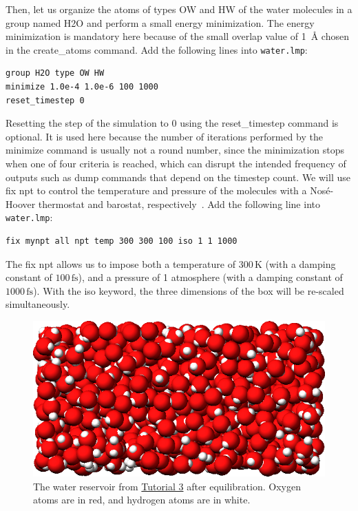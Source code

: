 \documentclass[9pt,tutorial]{livecoms}
\newcommand{\lmpcmd}[1]{\hspace{0pt}\colorbox{listing}{\textcolor{command}{\small{#1}}}\hspace{0pt}} %
\newcommand{\flecmd}[1]{\textcolor{command}{\texttt{#1}}} %
\begin{document}
Then, let us organize the atoms of types OW and HW of the water
molecules in a group named \lmpcmd{H2O} and perform a small energy
minimization.  The energy minimization is mandatory here because of the
small \lmpcmd{overlap} value of 1~Å chosen in the \lmpcmd{create\_atoms}
command.  Add the following lines into \flecmd{water.lmp}:
\begin{lstlisting}
group H2O type OW HW
minimize 1.0e-4 1.0e-6 100 1000
reset_timestep 0
\end{lstlisting}
Resetting the step of the simulation to 0 using the
\lmpcmd{reset\_timestep} command is optional.
{\color{blue}It is used here because the number of iterations performed by the \lmpcmd{minimize}
command is usually not a round number, since the minimization stops when one of
four criteria is reached, which can disrupt the intended frequency
of outputs such as \lmpcmd{dump} commands that depend on the timestep count.}
We will use \lmpcmd{fix npt} to control the temperature
and pressure of the molecules with a Nosé-Hoover thermostat and barostat,
respectively~\cite{nose1984unified, hoover1985canonical, martyna1994constant}.
Add the following line into \flecmd{water.lmp}:
\begin{lstlisting}
fix mynpt all npt temp 300 300 100 iso 1 1 1000
\end{lstlisting}
The \lmpcmd{fix npt} allows us to impose both a temperature of $300\,\text{K}$
(with a damping constant of $100\,\text{fs}$), and a pressure of 1 atmosphere
(with a damping constant of $1000\,\text{fs}$).  With the \lmpcmd{iso} keyword,
the three dimensions of the box will be re-scaled simultaneously.

\begin{figure}
\centering
\includegraphics[width=\linewidth]{PEG-water}
\caption{The water reservoir from \hyperref[all-atom-label]{Tutorial 3}
after equilibration.  Oxygen atoms are in red, and hydrogen atoms are in white.}
\label{fig:PEG-water}
\end{figure}
\end{document}
